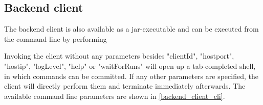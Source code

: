 		
		\subsection{Backend client}\label{usage_backend_client}
		The backend client is also available as a jar-executable \highlight{\backendclient} and can be executed from the command line by performing
		
		
		Invoking the client without any parameters besides "clientId", "hostport", "hostip", "logLevel", "help" or "waitForRuns" will open up a tab-completed shell, in which commands can be committed. If any other parameters are specified, the client will directly perform them and terminate immediately afterwards. The available command line parameters are shown in \ref{backend_client_cli}.
